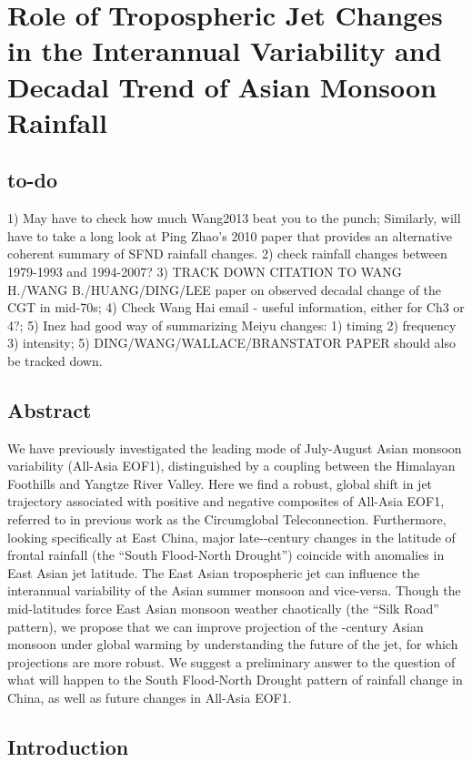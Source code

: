 \chapter{Role of Tropospheric Jet Changes in the Interannual Variability and Decadal Trend of Asian Monsoon Rainfall}

\section{to-do}
1) May have to check how much Wang2013 beat you to the punch; Similarly, will have to take a long look at Ping Zhao's 2010 paper that provides an alternative coherent summary of SFND rainfall changes. 2) check rainfall changes between 1979-1993 and 1994-2007? 3) TRACK DOWN CITATION TO WANG H./WANG B./HUANG/DING/LEE paper on observed decadal change of the CGT in mid-70s; 4) Check Wang Hai email - useful information, either for Ch3 or 4?; 5) Inez had good way of summarizing Meiyu changes: 1) timing 2) frequency 3) intensity; 5) DING/WANG/WALLACE/BRANSTATOR PAPER should also be tracked down.

\section{Abstract}
We have previously investigated the leading mode of July-August Asian monsoon variability (All-Asia EOF1), distinguished by a coupling between the Himalayan Foothills and Yangtze River Valley. Here we find a robust, global shift in jet trajectory associated with positive and negative composites of All-Asia EOF1, referred to in previous work as the Circumglobal Teleconnection. Furthermore, looking specifically at East China, major late--century changes in the latitude of frontal rainfall (the ``South Flood-North Drought'') coincide with anomalies in East Asian jet latitude. The East Asian tropospheric jet can influence the interannual variability of the Asian summer monsoon and vice-versa. Though the mid-latitudes force East Asian monsoon weather chaotically (the ``Silk Road'' pattern), we propose that we can improve projection of the -century Asian monsoon under global warming by understanding the future of the jet, for which projections are more robust. We suggest a preliminary answer to the question of what will happen to the South Flood-North Drought pattern of rainfall change in China, as well as future changes in All-Asia EOF1.

\section{Introduction}

